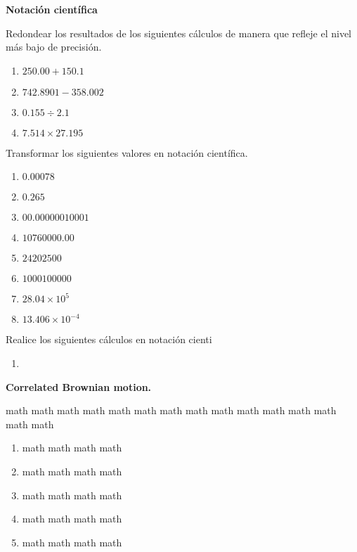 \documentclass[12pt,a4paper]{article}
\newcommand{\sect}[1]{
	\begin{tcolorbox}[colframe= white,top=2pt, bottom=2pt, colback = gris]
	 \textbf{#1} %
    \end{tcolorbox}
 }
\begin{document}
\begin{multicols}{2}
    \raggedcolumns
    
\sect{Notaci\'on cient\'ifica}

\begin{Exercice} Redondear los resultados de los siguientes c\'alculos de manera que refleje el nivel m\'as bajo de precisi\'on.
	
	\begin{enumerate}[1)]
		\item $250.00 + 150.1$
		\item $742.8901 - 358.002$
		\item $0.155 \div 2.1$
		\item $7.514 \times 27.195$
	\end{enumerate}
	
\end{Exercice}
    
\begin{Exercice} Transformar los siguientes valores en notaci\'on cient\'ifica.
     	
\begin{enumerate}[1)]
	\item $0.00078$
	\item $0.265$	
	\item $00.00000010001$
	\item $10760000.00$
	\item $24202500$
	\item $1000100000$
	\item $28.04 \times 10^{5}$
	\item $13.406 \times 10^{-4}$
\end{enumerate}

\end{Exercice}

\begin{Exercice} Realice los siguientes c\'alculos en notaci\'on cienti
	
	\begin{enumerate}[1)]
		\item 
	\end{enumerate}

\end{Exercice}

    \sect{Correlated Brownian motion.}

\begin{Exercice}math math math math math math math math math math math math math math math
\begin{enumerate}[label=\textbf{\color{gris}\arabic*.}]
    \item math math math math
    \item math math math math
    \item math math math math
    \item math math math math
    \item math math math math
    

\end{enumerate}
\end{Exercice}
\end{multicols}
\end{document}
